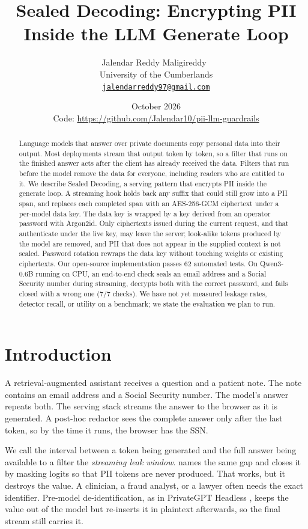 \documentclass[11pt]{article}
\title{\textbf{Sealed Decoding: Encrypting PII Inside the LLM Generate Loop}}
\author{%
  Jalendar Reddy Maligireddy~\orcidlink{0009-0002-5881-0084}\\
  University of the Cumberlands\\
  \href{mailto:jalendarreddy97@gmail.com}{\texttt{jalendarreddy97@gmail.com}}
}
\date{October 2026 \\[2pt] \small Code: \url{https://github.com/Jalendar10/pii-llm-guardrails}}
\begin{document}
\maketitle

\begin{abstract}
Language models that answer over private documents copy personal data into their output. Most deployments stream that output token by token, so a filter that runs on the finished answer acts after the client has already received the data. Filters that run before the model remove the data for everyone, including readers who are entitled to it. We describe Sealed Decoding, a serving pattern that encrypts PII inside the generate loop. A streaming hook holds back any suffix that could still grow into a PII span, and replaces each completed span with an AES-256-GCM ciphertext under a per-model data key. The data key is wrapped by a key derived from an operator password with Argon2id. Only ciphertexts issued during the current request, and that authenticate under the live key, may leave the server; look-alike tokens produced by the model are removed, and PII that does not appear in the supplied context is not sealed. Password rotation rewraps the data key without touching weights or existing ciphertexts. Our open-source implementation passes 62 automated tests. On Qwen3-0.6B running on CPU, an end-to-end check seals an email address and a Social Security number during streaming, decrypts both with the correct password, and fails closed with a wrong one (7/7 checks). We have not yet measured leakage rates, detector recall, or utility on a benchmark; we state the evaluation we plan to run.
\end{abstract}

\section{Introduction}
\label{sec:intro}

A retrieval-augmented assistant receives a question and a patient note. The note contains an email address and a Social Security number. The model's answer repeats both. The serving stack streams the answer to the browser as it is generated. A post-hoc redactor sees the complete answer only after the last token, so by the time it runs, the browser has the SSN.

We call the interval between a token being generated and the full answer being available to a filter the \emph{streaming leak window}. \citet{ram2025constrained} names the same gap and closes it by masking logits so that PII tokens are never produced. That works, but it destroys the value. A clinician, a fraud analyst, or a lawyer often needs the exact identifier. Pre-model de-identification, as in PrivateGPT Headless \citep{privategpt}, keeps the value out of the model but re-inserts it in plaintext afterwards, so the final stream still carries it.
\end{document}
